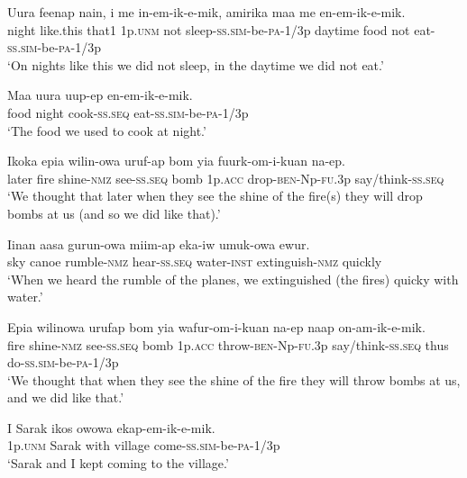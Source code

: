 \ea\label{ex:a:x87}
\gll  Uura  feenap  nain,  i  me  in-em-ik-e-mik,  amirika maa  me  en-em-ik-e-mik. \\
night  like.this  that1  1p.\textsc{unm}  not  sleep-\textsc{ss}.\textsc{sim}-be-\textsc{pa}-1/3p  daytime   food  not  eat-\textsc{ss}.\textsc{sim}-be-\textsc{pa}-1/3p\\
\glt ‘On nights like this we did not sleep, in the daytime we did not eat.’ \\
\z


\ea\label{ex:a:x88}
\gll  Maa  uura  uup-ep  en-em-ik-e-mik. \\
food  night  cook-\textsc{ss.seq}  eat-\textsc{ss}.\textsc{sim}-be-\textsc{pa}-1/3p \\
\glt ‘The food we used to cook at night.’ \\
\z


\ea\label{ex:a:x89}
\gll  Ikoka  epia  wilin-owa  uruf-ap  bom  yia   fuurk-om-i-kuan  na-ep. \\
later  fire  shine-\textsc{nmz}  see-\textsc{ss.seq}  bomb  1p.\textsc{acc}  drop-\textsc{ben}-Np-\textsc{fu}.3p  say/think-\textsc{ss.seq} \\ 
\glt ‘We thought that later when they see the shine of the fire(s) they will drop bombs at us (and so we did like that).’ \\
\z


\ea\label{ex:a:x90}
\gll  Iinan  aasa  gurun-owa  miim-ap  eka-iw   umuk-owa  ewur. \\
sky  canoe  rumble-\textsc{nmz}  hear-\textsc{ss.seq}  water-\textsc{inst} extinguish-\textsc{nmz}  quickly \\


\glt ‘When we heard the rumble of the planes, we extinguished (the fires) quicky with water.’ \\
\z


\ea\label{ex:a:x91}
\gll  Epia  wilinowa  urufap  bom  yia  wafur-om-i-kuan        na-ep  naap  on-am-ik-e-mik. \\
fire  shine-\textsc{nmz}  see-\textsc{ss.seq}  bomb  1p.\textsc{acc}  throw-\textsc{ben}-Np-\textsc{fu}.3p  say/think-\textsc{ss.seq}  thus  do{}-\textsc{ss}.\textsc{sim}-be-\textsc{pa}-1/3p \\
\glt ‘We thought that when they see the shine of the fire they will throw bombs at us, and we did like that.’ \\
\z


\ea\label{ex:a:x92}
\gll  I  Sarak  ikos  owowa  ekap-em-ik-e-mik. \\
1p.\textsc{unm}  Sarak  with  village  come-\textsc{ss}.\textsc{sim}-be-\textsc{pa}-1/3p \\
\glt ‘Sarak and I kept coming to the village.’ \\
\z


